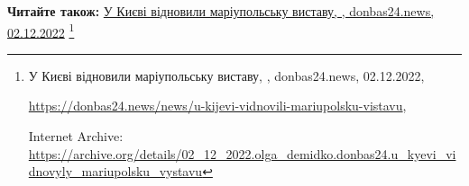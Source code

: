  
 
 
 
 

\def\pubIA{https://archive.org/details/02_12_2022.olga_demidko.donbas24.u_kyevi_vidnovyly_mariupolsku_vystavu}
\def\pubTitle{У Києві відновили маріупольську виставу}
\def\pubDate{02.12.2022}
\def\pubOrigin{https://donbas24.news/news/u-kijevi-vidnovili-mariupolsku-vistavu}
\def\pubAuthor{\pubAuthorDemidko}
\def\pubSite{donbas24.news}

\textbf{Читайте також:} \href{\pubIA}{%
\pubTitle, \pubAuthor, \pubSite, \pubDate}%
\footnote{\pubTitle, \pubAuthor, \pubSite, \pubDate, \par\url{\pubOrigin}, \par Internet Archive: \url{\pubIA}}
